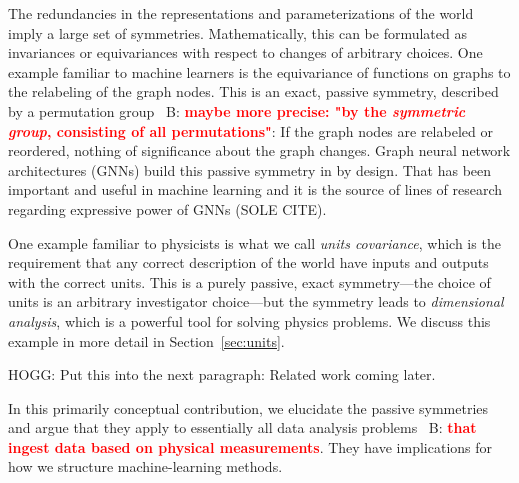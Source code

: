 \documentclass{article}
\theoremstyle{plain}
\theoremstyle{definition}
\theoremstyle{remark}
\newcommand{\sectionname}{Section}
\newcommand{\secref}[1]{\sectionname~\ref{#1}}
\newcommand{\bernhard}[1]{~B: \textcolor{red}{\textbf{#1}}}
\begin{document}
The redundancies in the representations and parameterizations of the world imply a large set of symmetries.
Mathematically, this can be formulated as invariances or equivariances with respect to changes of arbitrary choices.
One example familiar to machine learners is the equivariance of functions on graphs to the relabeling of the graph nodes.
This is an exact, passive symmetry, described by a permutation group \bernhard{maybe more precise: "by the {\em symmetric group}, consisting of all permutations"}:
If the graph nodes are relabeled or reordered, nothing of significance about the graph changes.
Graph neural network architectures (GNNs) build this passive symmetry in by design.
That has been important and useful in machine learning and it is the source of lines of research regarding expressive power of GNNs (SOLE CITE).

One example familiar to physicists is what we call \emph{units covariance}, which is the requirement that any correct description of the world have inputs and outputs with the correct units.
This is a purely passive, exact symmetry---the choice of units is an arbitrary investigator choice---but the symmetry leads to {\em dimensional analysis}, which is a powerful tool for solving physics problems.
We discuss this example in more detail in \secref{sec:units}.

HOGG: Put this into the next paragraph: Related work coming later.

In this primarily conceptual contribution, we elucidate the passive symmetries and argue that they apply to essentially all data analysis problems \bernhard{that ingest data based on physical measurements}.
They have implications for how we structure machine-learning methods.
\end{document}
